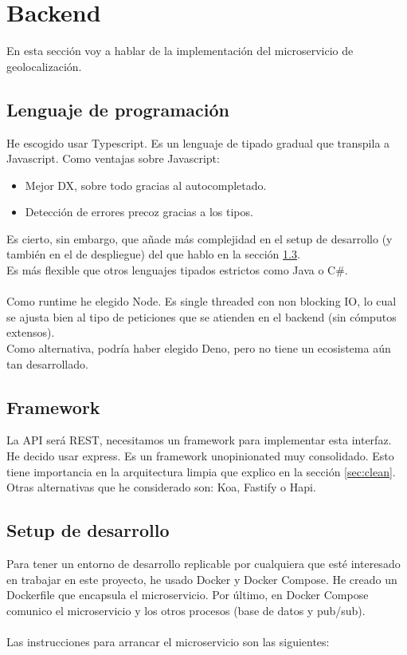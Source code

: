 \chapter{Backend}

En esta sección voy a hablar de la implementación del microservicio de geolocalización.
\section{Lenguaje de programación}
He escogido usar Typescript. Es un lenguaje de tipado gradual que transpila a Javascript.
Como ventajas sobre Javascript:
\begin{itemize}
	\item Mejor DX, sobre todo gracias al autocompletado.
	\item Detección de errores precoz gracias a los tipos.
\end{itemize}
Es cierto, sin embargo, que añade más complejidad en el setup de desarrollo (y también en el de despliegue) del que hablo en la sección \ref{sec:dev}. \\
Es más flexible que otros lenguajes tipados estrictos como Java o C\#. \\ \\
Como runtime he elegido Node. Es single threaded con non blocking IO, lo cual se ajusta bien al tipo 
de peticiones que se atienden en el backend (sin cómputos extensos).  \\
Como alternativa, podría haber elegido Deno, pero no tiene un ecosistema aún tan desarrollado.

\section{Framework}
La API será REST, necesitamos un framework para implementar esta interfaz. \\

He decido usar express. Es un framework unopinionated muy consolidado. Esto tiene importancia en la 
arquitectura limpia que explico en la sección \ref{sec:clean}. \\
Otras alternativas que he considerado son: Koa, Fastify o Hapi.

\section{Setup de desarrollo}\label{sec:dev}

Para tener un entorno de desarrollo replicable por cualquiera que esté interesado en trabajar en este proyecto, 
he usado Docker y Docker Compose. He creado un Dockerfile que encapsula el microservicio. 
Por último, en Docker Compose comunico el microservicio y los otros procesos (base de datos y pub/sub). \\ \\
Las instrucciones para arrancar el microservicio son las siguientes:

